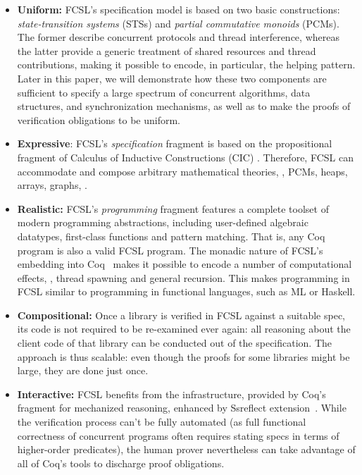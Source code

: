 \begin{itemize}[leftmargin=*]

\item \textbf{Uniform:} FCSL's specification model is based on two
  basic constructions: \emph{state-transition systems} (STSs) and
  \emph{partial commutative monoids} (PCMs). The former describe
  concurrent protocols and thread interference, whereas the latter
  provide a generic treatment of shared resources and thread
  contributions, making it possible to encode, in particular, the
  helping pattern. Later in this paper, we will demonstrate how these
  two components are sufficient to specify a large spectrum of
  concurrent algorithms, data structures, and synchronization
  mechanisms, as well as to make the proofs of verification
  obligations to be uniform.

\item \textbf{Expressive}: FCSL's \emph{specification} fragment is
  based on the propositional fragment of Calculus of Inductive
  Constructions (CIC) \cite{Bertot-Casteran:BOOK}. Therefore, FCSL can
  accommodate and compose arbitrary mathematical theories, \eg, PCMs,
  heaps, arrays, graphs, \etc.
%

\item \textbf{Realistic:} FCSL's \emph{programming} fragment features
  a complete toolset of modern programming abstractions, including
  user-defined algebraic datatypes, first-class functions and pattern
  matching. That is, any Coq program is also a valid FCSL program.
  The monadic nature of FCSL's embedding into
  Coq~\cite{Nanevski-al:ICFP06} makes it possible to encode a number
  of computational effects, \eg, thread spawning and general
  recursion. This makes programming in FCSL similar to programming in
  functional languages, such as ML or Haskell.

\item \textbf{Compositional:} Once a library is verified in FCSL
  against a suitable spec, its code is not required to be re-examined
  ever again: all reasoning about the client code of that library can
  be conducted out of the specification. 
  The approach is thus scalable: even though the proofs for some
  libraries might be large, they are done just once.

\item \textbf{Interactive:} FCSL benefits from the infrastructure,
  provided by Coq's fragment for mechanized reasoning, enhanced by
  Ssreflect extension~\cite{Gonthier-al:TR}.
% 
%
%
  While the verification process can't be fully automated (as full
  functional correctness of concurrent programs often requires stating
  specs in terms of higher-order predicates), the human prover
  nevertheless can take advantage of all of Coq's tools to discharge
  proof obligations.


\end{itemize}
